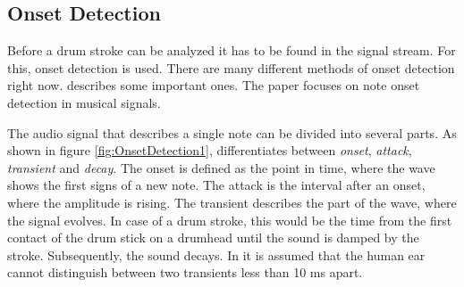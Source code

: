 


\subsection{Onset Detection} \label{section:OnsetDetection}

Before a drum stroke can be analyzed it has to be found in the signal stream. For this, onset detection is used. There are many different methods of onset detection right now. \autocite{Bello:2005} describes some important ones. The paper focuses on note onset detection in musical signals.

The audio signal that describes a single note can be divided into several parts. As shown in figure \ref{fig:OnsetDetection1}, \autocite{Bello:2005} differentiates between \textit{onset}, \textit{attack}, \textit{transient} and \textit{decay}. The onset is defined as the point in time, where the wave shows the first signs of a new note. The attack is the interval after an onset, where the amplitude is rising. The transient describes the part of the wave, where the signal evolves. In case of a drum stroke, this would be the time from the first contact of the drum stick on a drumhead until the sound is damped by the stroke. Subsequently, the sound decays. In \autocite{Bello:2005} it is assumed that the human ear cannot distinguish between two transients less than 10 ms apart.

